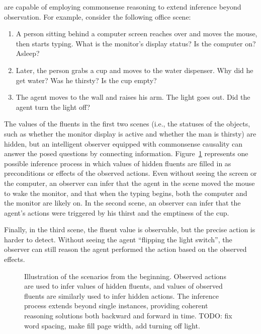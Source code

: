 \documentclass[10pt,journal,letterpaper,compsoc]{IEEEtran}
\begin{document}
 are capable of employing commonsense reasoning to extend inference beyond observation.  For example, consider the following office scene:  
\begin{enumerate}
\item A person sitting behind a computer screen reaches over and moves the mouse, then starts typing.  What is the monitor's display status?  Is the computer on? Asleep?  
\item Later, the person grabs a cup and moves to the water dispenser. Why did he get water?  Was he thirsty?  Is the cup empty?  
\item The agent moves to the wall and raises his arm.  The light goes out.  Did the agent turn the light off?
\end{enumerate}

The values of the fluents in the first two scenes (i.e., the statuses of the objects, such as whether the monitor display is active and whether the man is thirsty) are hidden, but an intelligent observer equipped with commonsense causality can answer the posed questions by connecting information.  Figure~\ref{fig:largepg} represents one possible inference process in which values of hidden fluents are filled in as preconditions or effects of the observed actions.  Even without seeing the screen or the computer, an observer can infer that the agent in the scene moved the mouse to wake the monitor, and that when the typing begins, both the computer and the monitor are likely on.  In the second scene, an observer can infer that the agent's actions were triggered by his thirst and the emptiness of the cup.  


Finally, in the third scene, the fluent value is observable, but the precise action is harder to detect.  Without seeing the agent ``flipping the light switch'', the observer can still reason the agent performed the action based on the observed effects.

\begin{figure}[hbtp]
\centering

\caption{Illustration of the scenarios from the beginning. Observed actions are used to infer values of hidden fluents, and values of observed fluents are similarly used to infer hidden actions.  The inference process extends beyond single instances, providing coherent reasoning solutions both backward and forward in time. 
TODO: fix word spacing, make fill page width, add turning off light.
\label{fig:largepg}}
\end{figure}
\end{document}

